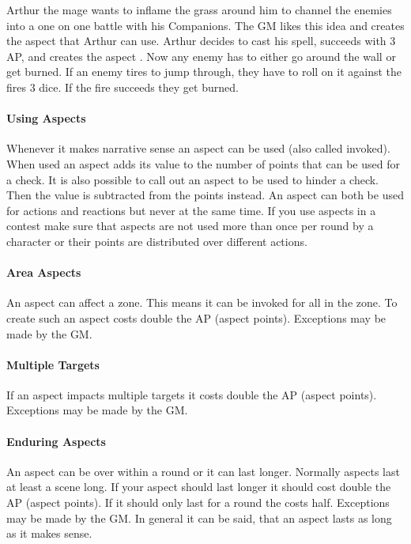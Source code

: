 \documentclass[11pt]{article}
\begin{document}
{\begin{pwexample}
Arthur the mage wants to inflame the grass around him to channel the enemies into a one on one battle with his Companions. The GM likes this idea and creates the aspect  that Arthur can use. Arthur decides to cast his spell, succeeds with 3 AP, and creates the aspect . Now any enemy has to either go around the wall or get burned. If an enemy tires to jump through, they have to roll on it against the fires 3 dice. If the fire succeeds they get burned.
\end{pwexample}

\paragraph*{Using Aspects}
\label{sec:orgf4d71cd}

Whenever it makes narrative sense an aspect can be used (also called invoked). When used an aspect adds its value to the number of points that can be used for a check. It is also possible to call out an aspect to be used to hinder a check. Then the value is subtracted from the points instead. An aspect can both be used for actions and reactions but never at the same time. If you use aspects in a contest make sure that aspects are not used more than once per round by a character or their points are distributed over different actions.

\paragraph*{Area Aspects}
\label{sec:org4504244}

An aspect can affect a zone. This means it can be invoked for all in the zone. To create such an aspect costs double the AP (aspect points). Exceptions may be made by the GM. 

\paragraph*{Multiple Targets}
\label{sec:orgbc8c7a2}
If an aspect impacts multiple targets it costs double the AP (aspect points). Exceptions may be made by the GM.

\paragraph*{Enduring Aspects}
\label{sec:orgbfa3fe3}
An aspect can be over within a round or it can last longer. Normally aspects last at least a scene long. If your aspect should last longer it should cost double the AP (aspect points). If it should only last for a round the costs half. Exceptions may be made by the GM. In general it can be said, that an aspect lasts as long as it makes sense.

}
\end{document}
